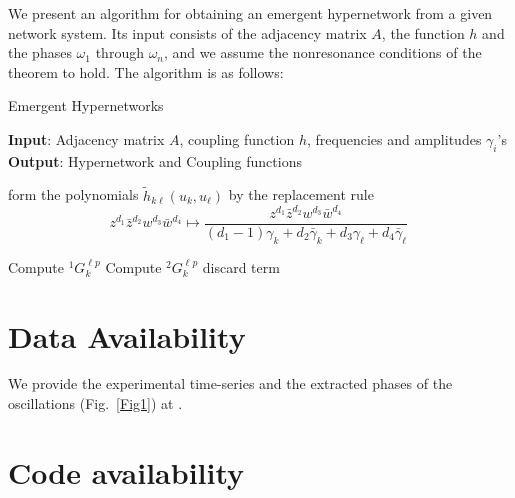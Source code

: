 \documentclass[12pt]{article}
\renewcommand{\mathcal}{\mathscr}
\theoremstyle{plain}
\theoremstyle{definition}
\theoremstyle{remark}
\theoremstyle{remark}
\begin{document}
We present an algorithm for obtaining an emergent hypernetwork from a given network system. Its input consists of the adjacency matrix $A$, the function $h$ and the phases $\omega_1$ through $\omega_n$, and we assume the nonresonance conditions of the theorem to hold.  The algorithm is as follows:
    \begin{algorithm}
    \caption{Emergent Hypernetworks}\label{euclid}
    \hspace*{\algorithmicindent} \textbf{Input}: Adjacency matrix $A$, coupling function $h$, frequencies and amplitudes $\gamma_i$'s \\
    \hspace*{\algorithmicindent} \textbf{Output}: Hypernetwork and Coupling functions
\begin{algorithmic}[1]
\ForEach {$k \in \mathcal S $}
\ForEach {$\ell \in \mathcal S $}
    \State form the polynomials $\tilde h_{k\ell}(u_k,u_\ell) $ by the replacement rule $$z^{d_1}\bar{z}^{d_2}w^{d_3}\bar{w}^{d_4} \mapsto\frac{z^{d_1}\bar{z}^{d_2}w^{d_3}\bar{w}^{d_4}}{(d_1-1)\gamma_k + d_2\bar{\gamma}_k + d_3\gamma_{\ell} + d_4\bar{\gamma}_{\ell} }\,$$
       
    \ForEach {$p \in \mathcal S $}
    \State Compute  $^1G_{k}^{\ell p}$
    \EndIf
    \State Compute  $^2 G_{k}^{\ell p}$
    \EndIf
\EndFor
 \EndIf
\EndFor
{}
     \State discard term
\EndIf
\EndFor
 \EndProcedure 
 
 \EndProcedure 
\EndFor

\end{algorithmic}
\end{algorithm}

\section*{Data Availability}

We provide the experimental time-series and the extracted phases of the oscillations (Fig.~\ref{Fig1}) at \cite{nijholt_data}.

\section*{Code availability}
\end{document}
